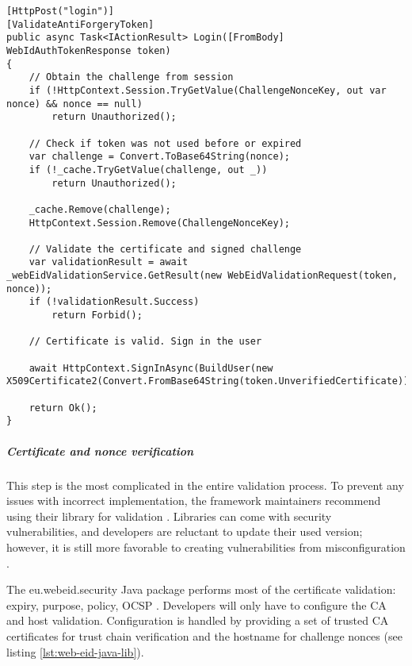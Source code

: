 \begin{lstlisting}[caption={Web eID Login Endpoint}, label={lst:web-eid-login}]
[HttpPost("login")]
[ValidateAntiForgeryToken]
public async Task<IActionResult> Login([FromBody] WebIdAuthTokenResponse token)
{
    // Obtain the challenge from session
    if (!HttpContext.Session.TryGetValue(ChallengeNonceKey, out var nonce) && nonce == null)
        return Unauthorized();

    // Check if token was not used before or expired
    var challenge = Convert.ToBase64String(nonce);
    if (!_cache.TryGetValue(challenge, out _))
        return Unauthorized();

    _cache.Remove(challenge);
    HttpContext.Session.Remove(ChallengeNonceKey);

    // Validate the certificate and signed challenge
    var validationResult = await _webEidValidationService.GetResult(new WebEidValidationRequest(token, nonce));
    if (!validationResult.Success)
        return Forbid();

    // Certificate is valid. Sign in the user

    await HttpContext.SignInAsync(BuildUser(new X509Certificate2(Convert.FromBase64String(token.UnverifiedCertificate)).Subject));

    return Ok();
}
\end{lstlisting}

\subparagraph{Certificate and nonce verification}

This step is the most complicated in the entire validation process. To prevent any issues with incorrect implementation, the framework maintainers recommend using their library for validation \cite{ria-webeid-source-web-eid-authtoken-validation-java-readme}. Libraries can come with security vulnerabilities, and developers are reluctant to update their used version; however, it is still more favorable to creating vulnerabilities from misconfiguration \cite{9240619}.

The eu.webeid.security Java package performs most of the certificate validation: expiry, purpose, policy, OCSP \cite{ria-webeid-source-web-eid-authtoken-validation-java-readme}. Developers will only have to configure the CA and host validation. Configuration is handled by providing a set of trusted CA certificates for trust chain verification and the hostname for challenge nonces (see listing \ref{lst:web-eid-java-lib}).


